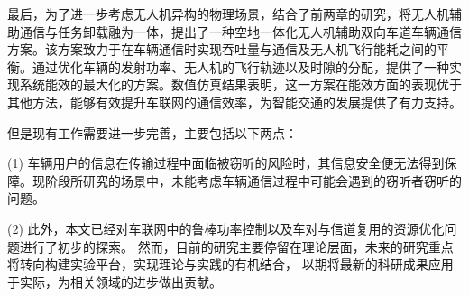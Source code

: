 最后，为了进一步考虑无人机异构的物理场景，结合了前两章的研究，将无人机辅助通信与任务卸载融为一体，提出了一种空地一体化无人机辅助双向车道车辆通信方案。该方案致力于在车辆通信时实现吞吐量与通信及无人机飞行能耗之间的平衡。通过优化车辆的发射功率、无人机的飞行轨迹以及时隙的分配，提供了一种实现系统能效的最大化的方案。数值仿真结果表明，这一方案在能效方面的表现优于其他方法，能够有效提升车联网的通信效率，为智能交通的发展提供了有力支持。

但是现有工作需要进一步完善，主要包括以下两点：


(1) 车辆用户的信息在传输过程中面临被窃听的风险时，其信息安全便无法得到保障。现阶段所研究的场景中，未能考虑车辆通信过程中可能会遇到的窃听者窃听的问题。


(2) 此外，本文已经对车联网中的鲁棒功率控制以及车对与信道复用的资源优化问题进行了初步的探索。
然而，目前的研究主要停留在理论层面，未来的研究重点将转向构建实验平台，实现理论与实践的有机结合，
以期将最新的科研成果应用于实际，为相关领域的进步做出贡献。

